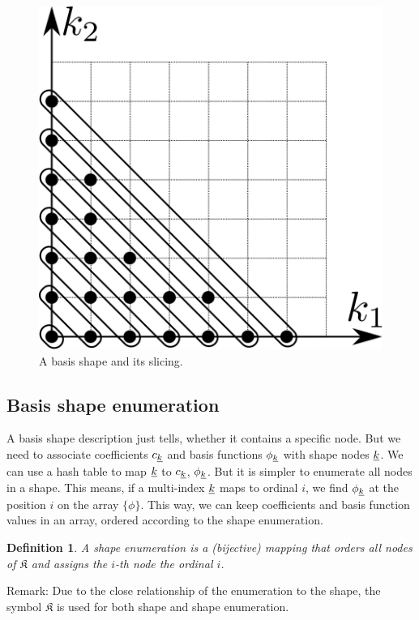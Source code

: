 \documentclass{article}
\newtheorem{definition}{Definition}
\begin{document}
\begin{figure}[H]
  \centering
  \includegraphics[]{shape_slicing}
  \caption{A basis shape and its slicing.}
\end{figure}


\subsection{Basis shape enumeration}
A basis shape description just tells, whether it contains a specific node.
But we need to associate coefficients \(c_{\underline{k}}\)
and basis functions \(\phi_{\underline{k}}\) with shape
nodes \(\underline{k}\). We can use a hash table to map \(\underline{k}\) to
\(c_{\underline{k}}\), \(\phi_{\underline{k}}\). But it is simpler to
enumerate all nodes in a shape. This means, if a multi-index \(\underline{k}\)
maps to ordinal \(i\), we find \(\phi_{\underline{k}}\) at the position
\(i\) on the array  \(\{\phi\}\).
This way, we can keep coefficients and basis function values in an array,
ordered according to the shape enumeration.

\begin{definition}
  A shape enumeration is a (bijective) mapping that orders all nodes
  of \( \mathfrak{K} \)
  and assigns the \(i\)-th node the ordinal \(i\).
\end{definition}

Remark: Due to the close relationship of the enumeration to the shape,
the symbol \(\mathfrak{K}\) is used for both shape and
shape enumeration.
\end{document}
